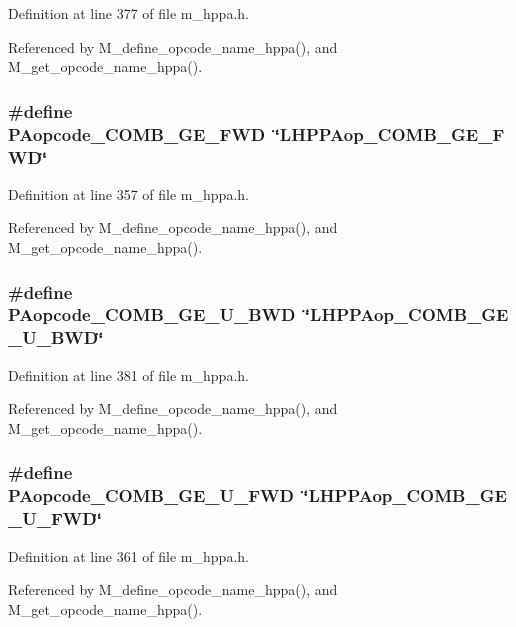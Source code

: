 Definition at line 377 of file m\_\-hppa.h.

Referenced by M\_\-define\_\-opcode\_\-name\_\-hppa(), and M\_\-get\_\-opcode\_\-name\_\-hppa().
\subsubsection{\setlength{\rightskip}{0pt plus 5cm}\#define PAopcode\_\-COMB\_\-GE\_\-FWD~\char`\"{}LHPPAop\_\-COMB\_\-GE\_\-FWD\char`\"{}}\label{m__hppa_8h_802db93278e0e8de34ce8f32906a04b1}




Definition at line 357 of file m\_\-hppa.h.

Referenced by M\_\-define\_\-opcode\_\-name\_\-hppa(), and M\_\-get\_\-opcode\_\-name\_\-hppa().
\subsubsection{\setlength{\rightskip}{0pt plus 5cm}\#define PAopcode\_\-COMB\_\-GE\_\-U\_\-BWD~\char`\"{}LHPPAop\_\-COMB\_\-GE\_\-U\_\-BWD\char`\"{}}\label{m__hppa_8h_097edb69e1e0d8082b1d238063e51c80}




Definition at line 381 of file m\_\-hppa.h.

Referenced by M\_\-define\_\-opcode\_\-name\_\-hppa(), and M\_\-get\_\-opcode\_\-name\_\-hppa().
\subsubsection{\setlength{\rightskip}{0pt plus 5cm}\#define PAopcode\_\-COMB\_\-GE\_\-U\_\-FWD~\char`\"{}LHPPAop\_\-COMB\_\-GE\_\-U\_\-FWD\char`\"{}}\label{m__hppa_8h_19cb2bb6e17036af7d2fa2643449b317}




Definition at line 361 of file m\_\-hppa.h.

Referenced by M\_\-define\_\-opcode\_\-name\_\-hppa(), and M\_\-get\_\-opcode\_\-name\_\-hppa().
